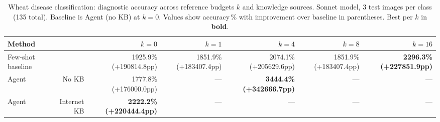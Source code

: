 \begin{table}[t]
\centering
\small
\caption{Wheat disease classification: diagnostic accuracy across reference budgets $k$ and knowledge sources. Sonnet model, 3 test images per class (135 total). Baseline is Agent (no KB) at $k{=}0$. Values show accuracy\,\% with improvement over baseline in parentheses. Best per $k$ in \textbf{bold}.}
\label{tab:wheat_main}
\begin{tabular}{lrrrrrr}
\toprule
Method & & $k=0$ & $k=1$ & $k=4$ & $k=8$ & $k=16$ \\
\midrule
Few-shot baseline & & 1925.9\% (+190814.8pp) & 1851.9\% (+183407.4pp) & 2074.1\% (+205629.6pp) & 1851.9\% (+183407.4pp) & \textbf{2296.3\% (+227851.9pp)} \\
Agent & No KB & 1777.8\% (+176000.0pp) & — & \textbf{3444.4\% (+342666.7pp)} & — & — \\
Agent & Internet KB & \textbf{2222.2\% (+220444.4pp)} & — & — & — & — \\
\bottomrule
\end{tabular}
\end{table}